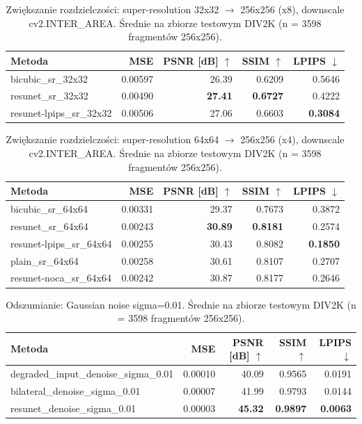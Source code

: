 \begin{table}[h]
\centering
\begin{tabular}{lrrrr}
\hline
Metoda & MSE & PSNR [dB] $\uparrow$ & SSIM $\uparrow$ & LPIPS $\downarrow$ \\
\hline
bicubic\_sr\_32x32 & 0.00597 & 26.39 & 0.6209 & 0.5646 \\
resunet\_sr\_32x32 & 0.00490 & \textbf{27.41} & \textbf{0.6727} & 0.4222 \\
resunet-lpips\_sr\_32x32 & 0.00506 & 27.06 & 0.6603 & \textbf{0.3084} \\
\hline
\end{tabular}
\caption{Zwiększanie rozdzielczości: super-resolution 32x32 $\rightarrow$ 256x256 (x8), downscale cv2.INTER\_AREA. Średnie na zbiorze testowym DIV2K (n = 3598 fragmentów 256x256).}
\end{table}

\begin{table}[h]
\centering
\begin{tabular}{lrrrr}
\hline
Metoda & MSE & PSNR [dB] $\uparrow$ & SSIM $\uparrow$ & LPIPS $\downarrow$ \\
\hline
bicubic\_sr\_64x64 & 0.00331 & 29.37 & 0.7673 & 0.3872 \\
resunet\_sr\_64x64 & 0.00243 & \textbf{30.89} & \textbf{0.8181} & 0.2574 \\
resunet-lpips\_sr\_64x64 & 0.00255 & 30.43 & 0.8082 & \textbf{0.1850} \\
plain\_sr\_64x64 & 0.00258 & 30.61 & 0.8107 & 0.2707 \\
resunet-noca\_sr\_64x64 & 0.00242 & 30.87 & 0.8177 & 0.2646 \\
\hline
\end{tabular}
\caption{Zwiększanie rozdzielczości: super-resolution 64x64 $\rightarrow$ 256x256 (x4), downscale cv2.INTER\_AREA. Średnie na zbiorze testowym DIV2K (n = 3598 fragmentów 256x256).}
\end{table}

\begin{table}[h]
\centering
\begin{tabular}{lrrrr}
\hline
Metoda & MSE & PSNR [dB] $\uparrow$ & SSIM $\uparrow$ & LPIPS $\downarrow$ \\
\hline
degraded\_input\_denoise\_sigma\_0.01 & 0.00010 & 40.09 & 0.9565 & 0.0191 \\
bilateral\_denoise\_sigma\_0.01 & 0.00007 & 41.99 & 0.9793 & 0.0144 \\
resunet\_denoise\_sigma\_0.01 & 0.00003 & \textbf{45.32} & \textbf{0.9897} & \textbf{0.0063} \\
\hline
\end{tabular}
\caption{Odszumianie: Gaussian noise sigma=0.01. Średnie na zbiorze testowym DIV2K (n = 3598 fragmentów 256x256).}
\end{table}

